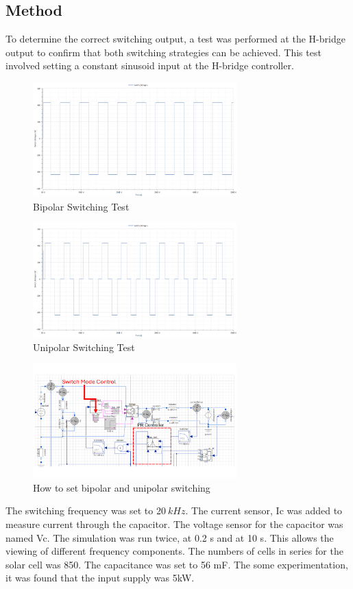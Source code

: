 \documentclass[12pt,twoside]{scrartcl}
\begin{document}
\subsection{Method}
To determine the correct switching output, a test was performed at the H-bridge output to confirm that both
switching strategies can be achieved. 
This test involved setting a constant sinusoid input at the H-bridge controller.
\begin{figure}[htp]
    \centering
    \includegraphics[width=0.7\textwidth]{Bipolar_sw.png}
    \caption{Bipolar Switching Test}
    \label{fig:Bipolar Switching}
\end{figure}
\begin{figure}[htp]
    \centering
    \includegraphics[width=0.7\textwidth]{Unipolar_sw.png}
    \caption{Unipolar Switching Test}
    \label{fig:Unipolar Switching}
\end{figure}
\newpage
\noindent
\begin{figure}[htp]
    \centering
    \includegraphics[width=0.7\textwidth]{Set-Up.PNG}
    \caption{How to set bipolar and unipolar switching}
    \label{fig:Set Up}
\end{figure}
The switching frequency was set to 20$\: kHz$. The current sensor, Ic was added to measure current 
through the capacitor. The voltage sensor for the capacitor was named Vc. The simulation was run twice, at 0.2 s and at 10 s. This allows the 
viewing of different frequency components. The numbers of cells in series for the solar cell was 850. The capacitance was set to 56 mF. The some experimentation,
it was found that the input supply was 5kW.
\newpage
\end{document}
